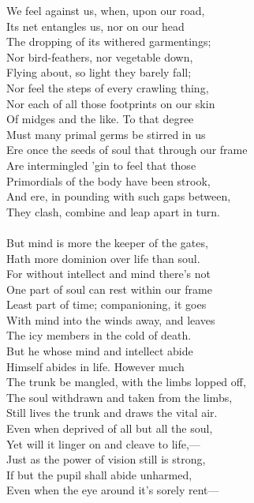 We feel against us, when, upon our road,\\
Its net entangles us, nor on our head\\
The dropping of its withered garmentings;\\
Nor bird-feathers, nor vegetable down,\\
Flying about, so light they barely fall;\\
Nor feel the steps of every crawling thing,\\
Nor each of all those footprints on our skin\\
Of midges and the like. To that degree\\
Must many primal germs be stirred in us\\
Ere once the seeds of soul that through our frame\\
Are intermingled 'gin to feel that those\\
Primordials of the body have been strook,\\
And ere, in pounding with such gaps between,\\
They clash, combine and leap apart in turn.\\
\\
But mind is more the keeper of the gates,\\
Hath more dominion over life than soul.\\
For without intellect and mind there's not\\
One part of soul can rest within our frame\\
Least part of time; companioning, it goes\\
With mind into the winds away, and leaves\\
The icy members in the cold of death.\\
But he whose mind and intellect abide\\
Himself abides in life. However much\\
The trunk be mangled, with the limbs lopped off,\\
The soul withdrawn and taken from the limbs,\\
Still lives the trunk and draws the vital air.\\
Even when deprived of all but all the soul,\\
Yet will it linger on and cleave to life,—\\
Just as the power of vision still is strong,\\
If but the pupil shall abide unharmed,\\
Even when the eye around it's sorely rent—\\
